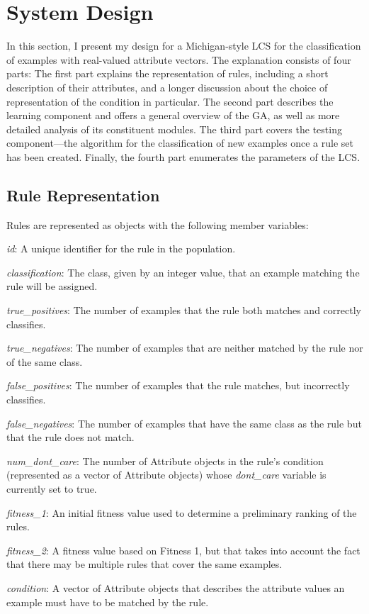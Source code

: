 \documentclass[11pt]{article}
\begin{document}
\section{System Design}

In this section, I present my design for a Michigan-style LCS for the classification of examples with real-valued attribute vectors. The explanation consists of four parts: The first part explains the representation of rules, including a short description of their attributes, and a longer discussion about the choice of representation of the condition in particular. The second part describes the learning component and offers a general overview of the GA, as well as more detailed analysis of its constituent modules. The third part covers the testing component---the algorithm for the classification of new examples once a rule set has been created. Finally, the fourth part enumerates the parameters of the LCS.

\subsection{Rule Representation}

Rules are represented as objects with the following member variables:

\begin{description}
\item \textit{id}: A unique identifier for the rule in the population.
\item \textit{classification}: The class, given by an integer value, that an example matching the rule will be assigned.
\item \textit{true\_positives}: The number of examples that the rule both matches and correctly classifies.
\item \textit{true\_negatives}: The number of examples that are neither matched by the rule nor of the same class.
\item \textit{false\_positives}: The number of examples that the rule matches, but incorrectly classifies.
\item \textit{false\_negatives}: The number of examples that have the same class as the rule but that the rule does not match.
\item \textit{num\_dont\_care}: The number of Attribute objects in the rule's condition (represented as a vector of Attribute objects) whose \textit{dont\_care} variable is currently set to true.
\item \textit{fitness\_1}: An initial fitness value used to determine a preliminary ranking of the rules.
\item \textit{fitness\_2}: A fitness value based on Fitness 1, but that takes into account the fact that there may be multiple rules that cover the same examples.
\item \textit{condition}: A vector of Attribute objects that describes the attribute values an example must have to be matched by the rule.
\end{description}
\end{document}
